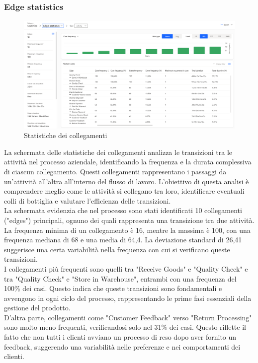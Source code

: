 \documentclass{article}
\begin{document}
\subsubsection{Edge statistics}
\begin{figure}[H]
    \centering
    \includegraphics[width=\textwidth]{imgMicrosoft/PrimaSimulazione/StatisticsEdgeStatisticsSimulazione1.png}
    \caption{Statistiche dei collegamenti}
    \label{fig:edge-statistics}
\end{figure}
La schermata delle statistiche dei collegamenti analizza le transizioni tra le attività nel processo aziendale, identificando la frequenza e la durata complessiva di ciascun collegamento. Questi collegamenti rappresentano i passaggi da un'attività all'altra all'interno del flusso di lavoro. L'obiettivo di questa analisi è comprendere meglio come le attività si collegano tra loro, identificare eventuali colli di bottiglia e valutare l'efficienza delle transizioni.\\
La schermata evidenzia che nel processo sono stati identificati 10 collegamenti ("edges") principali, ognuno dei quali rappresenta una transizione tra due attività. La frequenza minima di un collegamento è 16, mentre la massima è 100, con una frequenza mediana di 68 e una media di 64,4. La deviazione standard di 26,41 suggerisce una certa variabilità nella frequenza con cui si verificano queste transizioni.\\
I collegamenti più frequenti sono quelli tra "Receive Goods" e "Quality Check" e tra "Quality Check" e "Store in Warehouse", entrambi con una frequenza del 100\% dei casi. Questo indica che queste transizioni sono fondamentali e avvengono in ogni ciclo del processo, rappresentando le prime fasi essenziali della gestione del prodotto.\\
D'altra parte, collegamenti come "Customer Feedback" verso "Return Processing" sono molto meno frequenti, verificandosi solo nel 31\% dei casi. Questo riflette il fatto che non tutti i clienti avviano un processo di reso dopo aver fornito un feedback, suggerendo una variabilità nelle preferenze e nei comportamenti dei clienti.\\
\end{document}

